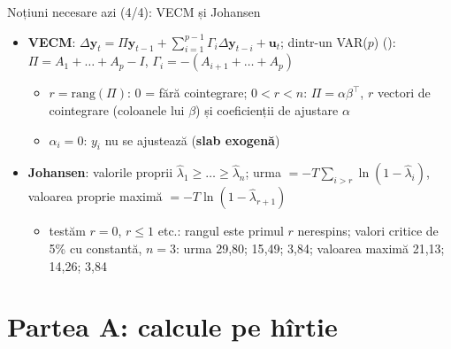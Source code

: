 \begin{frame}{Noțiuni necesare azi (4/4): VECM și Johansen}
\itemsize{\small}
\begin{itemize}
    \item \textbf{VECM}: $\Delta\mathbf y_t = \Pi\mathbf y_{t-1} + \sum_{i=1}^{p-1}\Gamma_i\Delta\mathbf y_{t-i} + \mathbf u_t$; dintr-un VAR($p$) (): $\Pi = A_1 + \dots + A_p - I$, $\Gamma_i = -(A_{i+1} + \dots + A_p)$
    \begin{itemize}
        \item $r = \mathrm{rang}(\Pi)$: 0 = fără cointegrare; $0 < r < n$: $\Pi = \alpha\beta^\top$, $r$ vectori de cointegrare (coloanele lui $\beta$) și coeficienții de ajustare $\alpha$
        \item $\alpha_i = 0$: $y_i$ nu se ajustează (\textbf{slab exogenă})
    \end{itemize}
    \item \textbf{Johansen}: valorile proprii $\hat\lambda_1 \ge \dots \ge \hat\lambda_n$; urma $= -T\sum_{i>r}\ln(1 - \hat\lambda_i)$, valoarea proprie maximă $= -T\ln(1 - \hat\lambda_{r+1})$
    \begin{itemize}
        \item testăm $r = 0$, $r \le 1$ etc.: rangul este primul $r$ nerespins; valori critice de 5\% cu constantă, $n = 3$: urma 29{,}80; 15{,}49; 3{,}84; valoarea maximă 21{,}13; 14{,}26; 3{,}84
    \end{itemize}
\end{itemize}
\end{frame}


\section{Partea A: calcule pe hîrtie}

